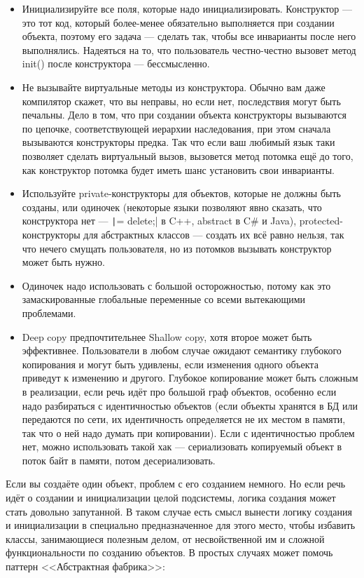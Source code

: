 \documentclass{../../text-style}
\begin{document}
\begin{itemize}
    \item Инициализируйте все поля, которые надо инициализировать. Конструктор --- это тот код, который более-менее обязательно выполняется при создании объекта, поэтому его задача --- сделать так, чтобы все инварианты после него выполнялись. Надеяться на то, что пользователь честно-честно вызовет метод init() после конструктора --- бессмысленно.
    \item Не вызывайте виртуальные методы из конструктора. Обычно вам даже компилятор скажет, что вы неправы, но если нет, последствия могут быть печальны. Дело в том, что при создании объекта конструкторы вызываются по цепочке, соответствующей иерархии наследования, при этом сначала вызываются конструкторы предка. Так что если ваш любимый язык таки позволяет сделать виртуальный вызов, вызовется метод потомка ещё до того, как конструктор потомка будет иметь шанс установить свои инварианты.
    \item Используйте private-конструкторы для объектов, которые не должны быть созданы, или одиночек (некоторые языки позволяют явно сказать, что конструктора нет --- \texttt|= delete;| в C++, abstract в C\# и Java), protected-конструкторы для абстрактных классов --- создать их всё равно нельзя, так что нечего смущать пользователя, но из потомков вызывать конструктор может быть нужно.
    \item Одиночек надо использовать с большой осторожностью, потому как это замаскированные глобальные переменные со всеми вытекающими проблемами.
    \item Deep copy предпочтительнее Shallow copy, хотя второе может быть эффективнее. Пользователи в любом случае ожидают семантику глубокого копирования и могут быть удивлены, если изменения одного объекта приведут к изменению и другого. Глубокое копирование может быть сложным в реализации, если речь идёт про большой граф объектов, особенно если надо разбираться с идентичностью объектов (если объекты хранятся в БД или передаются по сети, их идентичность определяется не их местом в памяти, так что о ней надо думать при копировании). Если с идентичностью проблем нет, можно использовать такой хак --- сериализовать копируемый объект в поток байт в памяти, потом десериализовать.
\end{itemize}

Если вы создаёте один объект, проблем с его созданием немного. Но если речь идёт о создании и инициализации целой подсистемы, логика создания может стать довольно запутанной. В таком случае есть смысл вынести логику создания и инициализации в специально предназначенное для этого место, чтобы избавить классы, занимающиеся полезным делом, от несвойственной им и сложной функциональности по созданию объектов. В простых случаях может помочь паттерн <<Абстрактная фабрика>>:
\end{document}
